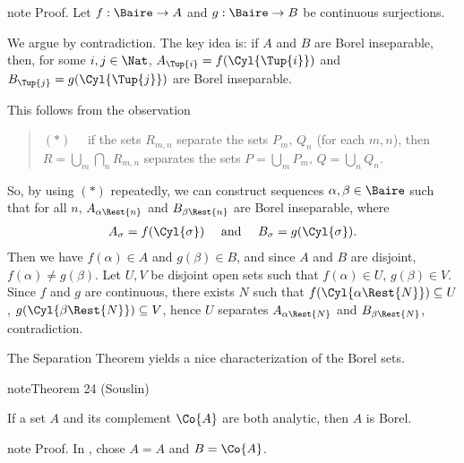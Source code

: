\documentclass[letterpaper,10pt,english]{jupyterBook}
\begin{document}
\begin{sphinxadmonition}{note}
\sphinxAtStartPar
Proof. Let \(f:\Baire \to A\) and \(g:\Baire \to B\) be continuous surjections.

\sphinxAtStartPar
We argue by contradiction. The key idea is: if \(A\) and \(B\) are Borel inseparable, then, for some \(i,j \in \Nat\), \(A_{\Tup{i}} = f(\Cyl{\Tup{i}})\) and \(B_{\Tup{j}} = g(\Cyl{\Tup{j}})\) are Borel inseparable.

\sphinxAtStartPar
This follows from the observation
\begin{quote}

\sphinxAtStartPar
\((*)\quad \) if the sets  \(R_{m,n}\) separate the sets  \(P_m, \, Q_n\) (for each \(m,n\)), then \(R = \bigcup_m \bigcap_n R_{m,n}\) separates the sets \(P =  \bigcup_m P_m, \, Q =  \bigcup_n Q_n.\)
\end{quote}

\sphinxAtStartPar
So, by using \((*)\) repeatedly, we can construct sequences \(\alpha, \beta \in \Baire\) such that for all \(n\),
\(A_{\alpha\Rest{n}}\) and \(B_{\beta\Rest{n}}\) are Borel inseparable, where
\begin{equation*}
\begin{split}
    A_{\sigma} = f(\Cyl{\sigma}) \quad \text{ and } \quad B_{\sigma} = g(\Cyl{\sigma}).
\end{split}
\end{equation*}
\sphinxAtStartPar
Then we have \(f(\alpha) \in A\) and \(g(\beta) \in B\), and since \(A\) and \(B\) are disjoint, \(f(\alpha) \neq g(\beta)\). Let \(U,V\) be disjoint open sets such that \(f(\alpha) \in U\), \(g(\beta) \in V\). Since \(f\) and \(g\) are continuous, there exists \(N\) such that \(f(\Cyl{\alpha\Rest{N}}) \subseteq U\), \(g(\Cyl{\beta\Rest{N}}) \subseteq V\), hence \(U\) separates \(A_{\alpha\Rest{N}}\) and \(B_{\beta\Rest{N}}\), contradiction.
\end{sphinxadmonition}

\sphinxAtStartPar
The Separation Theorem yields a nice characterization of the Borel sets.
\label{analytic:Borel-Delta11}
\begin{sphinxadmonition}{note}{Theorem 24 (Souslin)}



\sphinxAtStartPar
If a set \(A\) and its complement \(\Co{A}\) are both analytic, then \(A\) is Borel.
\end{sphinxadmonition}

\begin{sphinxadmonition}{note}
\sphinxAtStartPar
Proof. In {\hyperref[\detokenize{analytic:thm-Lusin-separation}]{}}, chose \(A = A\) and \(B = \Co{A}\).
\end{sphinxadmonition}
\end{document}
